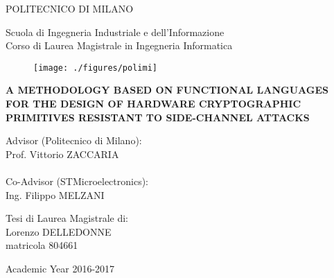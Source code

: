 \thispagestyle{empty}
\vspace*{-1.5cm} \bfseries{
\begin{center}
  \large
  POLITECNICO DI MILANO\\
  \normalsize
  
  Scuola di Ingegneria Industriale e dell'Informazione\\
  Corso di Laurea Magistrale in Ingegneria Informatica\\
  
  \vspace*{0.3cm}

  \begin{figure}[htbp]
    \begin{center}
      \texttt{[image: ./figures/polimi]}
    \end{center}
  \end{figure}
  \vspace*{0.3cm} \LARGE



  \textbf{A METHODOLOGY BASED ON FUNCTIONAL LANGUAGES
           FOR THE DESIGN OF HARDWARE CRYPTOGRAPHIC 
           PRIMITIVES RESISTANT TO SIDE-CHANNEL ATTACKS}\\



  \vspace*{.75truecm} \large
\end{center}
\vspace*{2.5cm} \large
\begin{flushleft}


  Advisor (Politecnico di Milano):\\ Prof. Vittorio ZACCARIA\\
  ~\\
  Co-Advisor (STMicroelectronics):\\ Ing. Filippo MELZANI

\end{flushleft}
\vspace*{1.0cm}
\begin{flushright}

  Tesi di Laurea Magistrale di:\\ Lorenzo DELLEDONNE\\ matricola 804661


\end{flushright}
\vspace*{1.0cm}
\begin{center}



  Academic Year 2016-2017 
\end{center} 
}
\clearpage
